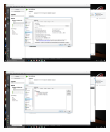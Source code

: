 \documentclass[a4paper,10pt]{article}
\begin{document}
\begin{minipage}{0.5\linewidth}
\begin{figure}[H]
\begin{center}
\includegraphics[width=5.5cm]{fig15.png}
\vspace*{-1mm}
\caption{\small  \label{fig:15}}
\end{center}
\end{figure}
\end{minipage}
\begin{minipage}{0.5\linewidth}
\begin{figure}[H]
\begin{center}
\includegraphics[width=5.5cm]{fig16.png}
\vspace*{-1mm}
\caption{\small  \label{fig:16}}
\end{center}
\end{figure}
\end{minipage}
\end{document}
